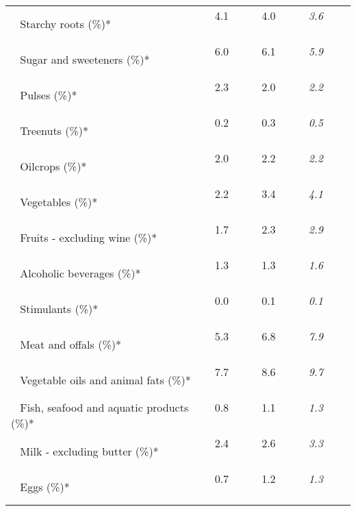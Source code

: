 \begin{tabular}{L{3.9cm} R{1cm} R{1cm} R{1cm}}
	 ~ Starchy roots (\%)* & 4.1 ~ \ \ & 4.0 ~ \ \ & \textit{3.6} ~ \ \ \\ 
	 ~ Sugar and sweeteners (\%)* & 6.0 ~ \ \ & 6.1 ~ \ \ & \textit{5.9} ~ \ \ \\ 
	 ~ Pulses (\%)* & 2.3 ~ \ \ & 2.0 ~ \ \ & \textit{2.2} ~ \ \ \\ 
	 ~ Treenuts (\%)* & 0.2 ~ \ \ & 0.3 ~ \ \ & \textit{0.5} ~ \ \ \\ 
	 ~ Oilcrops (\%)* & 2.0 ~ \ \ & 2.2 ~ \ \ & \textit{2.2} ~ \ \ \\ 
	 ~ Vegetables (\%)* & 2.2 ~ \ \ & 3.4 ~ \ \ & \textit{4.1} ~ \ \ \\ 
	 ~ Fruits - excluding wine (\%)* & 1.7 ~ \ \ & 2.3 ~ \ \ & \textit{2.9} ~ \ \ \\ 
	 ~ Alcoholic beverages (\%)* & 1.3 ~ \ \ & 1.3 ~ \ \ & \textit{1.6} ~ \ \ \\ 
	 ~ Stimulants (\%)* & 0.0 ~ \ \ & 0.1 ~ \ \ & \textit{0.1} ~ \ \ \\ 
	 ~ Meat and offals (\%)* & 5.3 ~ \ \ & 6.8 ~ \ \ & \textit{7.9} ~ \ \ \\ 
	 ~ Vegetable oils and animal fats (\%)* & 7.7 ~ \ \ & 8.6 ~ \ \ & \textit{9.7} ~ \ \ \\ 
	 ~ Fish, seafood and aquatic products (\%)* & 0.8 ~ \ \ & 1.1 ~ \ \ & \textit{1.3} ~ \ \ \\ 
	 ~ Milk - excluding butter (\%)* & 2.4 ~ \ \ & 2.6 ~ \ \ & \textit{3.3} ~ \ \ \\ 
	 ~ Eggs (\%)* & 0.7 ~ \ \ & 1.2 ~ \ \ & \textit{1.3} ~ \ \ \\ 
       \toprule
      \end{tabular}
      \clearpage
{}
